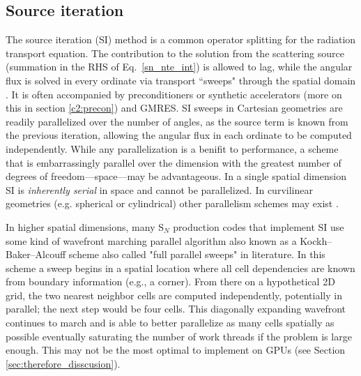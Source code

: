 \subsection{Source iteration}
\label{c2:source_iterations}

The source iteration (SI) method is a common operator splitting for the radiation transport equation.
The contribution to the solution from the scattering source (summation in the RHS of Eq.~\eqref{sn_nte_int}) is allowed to lag, while the angular flux is solved in every ordinate via transport ``sweeps" through the spatial domain \cite{lewis_computational_1984}.
It is often accompanied by preconditioners or synthetic accelerators (more on this in section \ref{c2:precon}) and GMRES.
SI sweeps in Cartesian geometries are readily parallelized over the number of angles, as the source term is known from the previous iteration, allowing the angular flux in each ordinate to be computed independently.
While any parallelization is a benifit to performance, a scheme that is embarrassingly parallel over the dimension with the greatest number of degrees of freedom---space---may be advantageous.
In a single spatial dimension SI is \textit{inherently serial} in space and cannot be parallelized.
In curvilinear geometries (e.g. spherical or cylindrical) other parallelism schemes may exist \cite{palmer_phd}.

In higher spatial dimensions, many S$_N$ production codes that implement SI use some kind of wavefront marching parallel algorithm also known as a Kockh--Baker--Alcouff scheme \cite{baker_kba_2017, colomer_parallel_2013} also called "full parallel sweeps" in literature.
In this scheme a sweep begins in a spatial location where all cell dependencies are known from boundary information (e.g., a corner).
From there on a hypothetical 2D grid, the two nearest neighbor cells are computed independently, potentially in parallel; the next step would be four cells.
This diagonally expanding wavefront continues to march and is able to better parallelize as many cells spatially as possible eventually saturating the number of work threads if the problem is large enough.
This may not be the most optimal to implement on GPUs (see Section \ref{sec:therefore_disscusion}).

